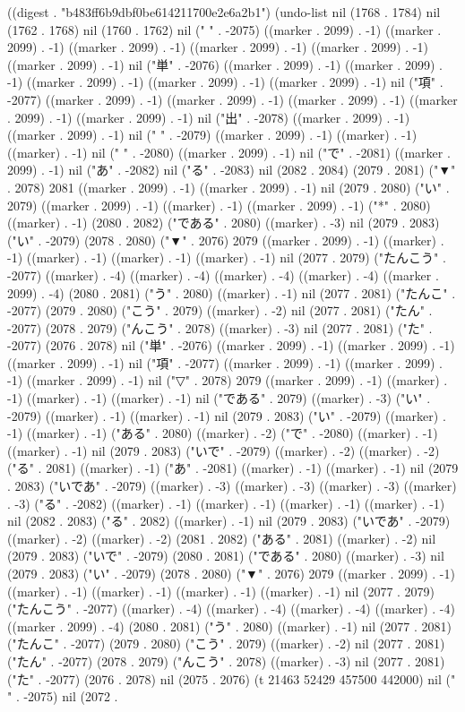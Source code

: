 
((digest . "b483ff6b9dbf0be614211700e2e6a2b1") (undo-list nil (1768 . 1784) nil (1762 . 1768) nil (1760 . 1762) nil (" " . -2075) ((marker . 2099) . -1) ((marker . 2099) . -1) ((marker . 2099) . -1) ((marker . 2099) . -1) ((marker . 2099) . -1) ((marker . 2099) . -1) nil ("単" . -2076) ((marker . 2099) . -1) ((marker . 2099) . -1) ((marker . 2099) . -1) ((marker . 2099) . -1) ((marker . 2099) . -1) nil ("項" . -2077) ((marker . 2099) . -1) ((marker . 2099) . -1) ((marker . 2099) . -1) ((marker . 2099) . -1) ((marker . 2099) . -1) nil ("出" . -2078) ((marker . 2099) . -1) ((marker . 2099) . -1) nil ("
" . -2079) ((marker . 2099) . -1) ((marker) . -1) ((marker) . -1) nil (" " . -2080) ((marker . 2099) . -1) nil ("で" . -2081) ((marker . 2099) . -1) nil ("あ" . -2082) nil ("る" . -2083) nil (2082 . 2084) (2079 . 2081) ("▼" . 2078) 2081 ((marker . 2099) . -1) ((marker . 2099) . -1) nil (2079 . 2080) ("い" . 2079) ((marker . 2099) . -1) ((marker) . -1) ((marker . 2099) . -1) ("*" . 2080) ((marker) . -1) (2080 . 2082) ("である" . 2080) ((marker) . -3) nil (2079 . 2083) ("い" . -2079) (2078 . 2080) ("▼" . 2076) 2079 ((marker . 2099) . -1) ((marker) . -1) ((marker) . -1) ((marker) . -1) ((marker) . -1) nil (2077 . 2079) ("たんこう" . -2077) ((marker) . -4) ((marker) . -4) ((marker) . -4) ((marker) . -4) ((marker . 2099) . -4) (2080 . 2081) ("う" . 2080) ((marker) . -1) nil (2077 . 2081) ("たんこ" . -2077) (2079 . 2080) ("こう" . 2079) ((marker) . -2) nil (2077 . 2081) ("たん" . -2077) (2078 . 2079) ("んこう" . 2078) ((marker) . -3) nil (2077 . 2081) ("た" . -2077) (2076 . 2078) nil ("単" . -2076) ((marker . 2099) . -1) ((marker . 2099) . -1) ((marker . 2099) . -1) nil ("項" . -2077) ((marker . 2099) . -1) ((marker . 2099) . -1) ((marker . 2099) . -1) nil ("▽" . 2078) 2079 ((marker . 2099) . -1) ((marker) . -1) ((marker) . -1) ((marker) . -1) nil ("である" . 2079) ((marker) . -3) ("い" . -2079) ((marker) . -1) ((marker) . -1) nil (2079 . 2083) ("い" . -2079) ((marker) . -1) ((marker) . -1) ("ある" . 2080) ((marker) . -2) ("で" . -2080) ((marker) . -1) ((marker) . -1) nil (2079 . 2083) ("いで" . -2079) ((marker) . -2) ((marker) . -2) ("る" . 2081) ((marker) . -1) ("あ" . -2081) ((marker) . -1) ((marker) . -1) nil (2079 . 2083) ("いであ" . -2079) ((marker) . -3) ((marker) . -3) ((marker) . -3) ((marker) . -3) ("る" . -2082) ((marker) . -1) ((marker) . -1) ((marker) . -1) ((marker) . -1) nil (2082 . 2083) ("る" . 2082) ((marker) . -1) nil (2079 . 2083) ("いであ" . -2079) ((marker) . -2) ((marker) . -2) (2081 . 2082) ("ある" . 2081) ((marker) . -2) nil (2079 . 2083) ("いで" . -2079) (2080 . 2081) ("である" . 2080) ((marker) . -3) nil (2079 . 2083) ("い" . -2079) (2078 . 2080) ("▼" . 2076) 2079 ((marker . 2099) . -1) ((marker) . -1) ((marker) . -1) ((marker) . -1) ((marker) . -1) nil (2077 . 2079) ("たんこう" . -2077) ((marker) . -4) ((marker) . -4) ((marker) . -4) ((marker) . -4) ((marker . 2099) . -4) (2080 . 2081) ("う" . 2080) ((marker) . -1) nil (2077 . 2081) ("たんこ" . -2077) (2079 . 2080) ("こう" . 2079) ((marker) . -2) nil (2077 . 2081) ("たん" . -2077) (2078 . 2079) ("んこう" . 2078) ((marker) . -3) nil (2077 . 2081) ("た" . -2077) (2076 . 2078) nil (2075 . 2076) (t 21463 52429 457500 442000) nil (" " . -2075) nil (2072 . 